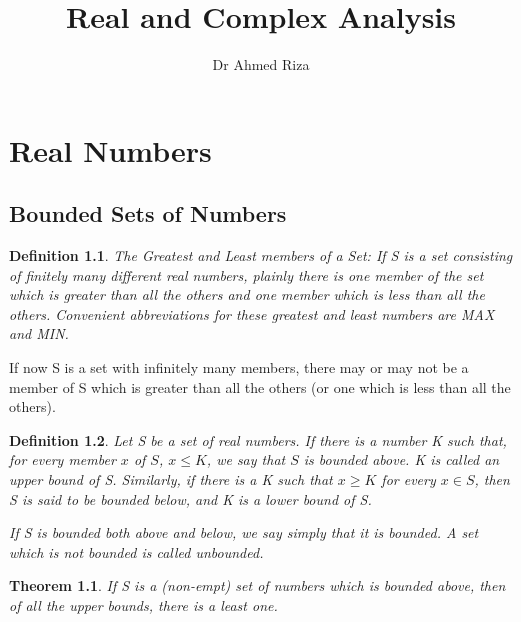 \message{ !name(RealAnalysis.tex)}\documentclass[12pt]{scrbook}
\newtheorem*{definition}{Definition}
\newtheorem{theorem}{Theorem}[section]
\begin{document}


\title{Real and Complex Analysis}
\author{Dr Ahmed Riza}
\date{}
\maketitle

\tableofcontents

\chapter{Real Numbers}

\section{Bounded Sets of Numbers}

\begin{definition}
The Greatest and Least members of a Set: If S is a set consisting of finitely many different real numbers, plainly there is one member of the set which is greater than all the others and one member which is less than all the others.  Convenient abbreviations for these greatest and least numbers are MAX and MIN.
\end{definition}

If now S is a set with infinitely many members, there may or may not be a member of S which is greater than all the others (or one which is less than all the others).

\begin{definition}
Let S be a set of real numbers.  If there is a number K such that, for every member $x$ of $S$, $ x \leq K$, we say that $S$ is bounded above. K is called an {\em upper bound} of S.  Similarly, if there is a K such that $x \ge K$ for every $x \in S$, then S is said to be bounded below, and K is a {\em lower bound} of S.

If S is bounded both above and below, we say simply that it is {\em bounded}. A set which is not bounded is called {\em unbounded}.
\end{definition}

\begin{theorem} %
\label{theorem-1.8}
If S is a (non-empt) set of numbers which is bounded above, then of all the upper bounds, there is a least one.
\end{theorem}
\end{document}
